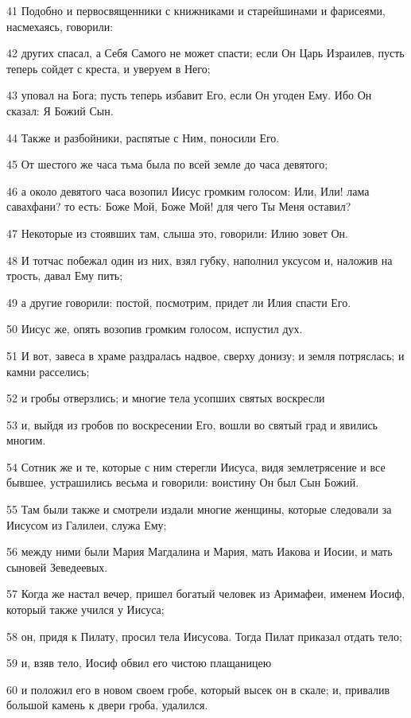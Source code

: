 \par 41 Подобно и первосвященники с книжниками и старейшинами и фарисеями, насмехаясь, говорили:
\par 42 других спасал, а Себя Самого не может спасти; если Он Царь Израилев, пусть теперь сойдет с креста, и уверуем в Него;
\par 43 уповал на Бога; пусть теперь избавит Его, если Он угоден Ему. Ибо Он сказал: Я Божий Сын.
\par 44 Также и разбойники, распятые с Ним, поносили Его.
\par 45 От шестого же часа тьма была по всей земле до часа девятого;
\par 46 а около девятого часа возопил Иисус громким голосом: Или, Или! лама савахфани? то есть: Боже Мой, Боже Мой! для чего Ты Меня оставил?
\par 47 Некоторые из стоявших там, слыша это, говорили: Илию зовет Он.
\par 48 И тотчас побежал один из них, взял губку, наполнил уксусом и, наложив на трость, давал Ему пить;
\par 49 а другие говорили: постой, посмотрим, придет ли Илия спасти Его.
\par 50 Иисус же, опять возопив громким голосом, испустил дух.
\par 51 И вот, завеса в храме раздралась надвое, сверху донизу; и земля потряслась; и камни расселись;
\par 52 и гробы отверзлись; и многие тела усопших святых воскресли
\par 53 и, выйдя из гробов по воскресении Его, вошли во святый град и явились многим.
\par 54 Сотник же и те, которые с ним стерегли Иисуса, видя землетрясение и все бывшее, устрашились весьма и говорили: воистину Он был Сын Божий.
\par 55 Там были также и смотрели издали многие женщины, которые следовали за Иисусом из Галилеи, служа Ему;
\par 56 между ними были Мария Магдалина и Мария, мать Иакова и Иосии, и мать сыновей Зеведеевых.
\par 57 Когда же настал вечер, пришел богатый человек из Аримафеи, именем Иосиф, который также учился у Иисуса;
\par 58 он, придя к Пилату, просил тела Иисусова. Тогда Пилат приказал отдать тело;
\par 59 и, взяв тело, Иосиф обвил его чистою плащаницею
\par 60 и положил его в новом своем гробе, который высек он в скале; и, привалив большой камень к двери гроба, удалился.
